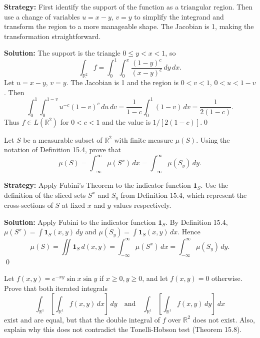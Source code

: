 \noindent\textbf{Strategy:} First identify the support of the function as a triangular region. Then use a change of variables \(u = x-y\), \(v = y\) to simplify the integrand and transform the region to a more manageable shape. The Jacobian is 1, making the transformation straightforward.

\bigskip\noindent\textbf{Solution:}
The support is the triangle \(0\le y < x < 1\), so
\[
\int_{\mathbb{R}^2} f = \int_0^1\!\int_0^x \frac{(1-y)^c}{(x-y)^c}\,dy\,dx.
\]
Let \(u=x-y\), \(v=y\). The Jacobian is 1 and the region is \(0<v<1\), \(0<u<1-v\). Then
\[
\int_0^1\!\int_0^{1-v} u^{-c}(1-v)^c\,du\,dv
= \frac{1}{1-c}\int_0^1 (1-v)\,dv = \frac{1}{2(1-c)}.
\]
Thus \(f\in L(\mathbb{R}^2)\) for \(0<c<1\) and the value is \(1/[2(1-c)]\).\qed


\begin{problembox}
Let \( S \) be a measurable subset of \( \mathbb{R}^2 \) with finite measure \( \mu(S) \). Using the notation of Definition 15.4, prove that
\[
\mu(S) = \int_{-\infty}^{\infty} \mu(S^x) \, dx = \int_{-\infty}^{\infty} \mu(S_y) \, dy.
\]
\end{problembox}

\noindent\textbf{Strategy:} Apply Fubini's Theorem to the indicator function \(\mathbf{1}_S\). Use the definition of the sliced sets \(S^x\) and \(S_y\) from Definition 15.4, which represent the cross-sections of \(S\) at fixed \(x\) and \(y\) values respectively.

\bigskip\noindent\textbf{Solution:}
Apply Fubini to the indicator function \(\mathbf{1}_S\). By Definition 15.4, \(\mu(S^x)=\int \mathbf{1}_S(x,y)\,dy\) and \(\mu(S_y)=\int \mathbf{1}_S(x,y)\,dx\). Hence
\[
\mu(S)=\iint \mathbf{1}_S\,d(x,y)=\int_{-\infty}^{\infty}\!\mu(S^x)\,dx=\int_{-\infty}^{\infty}\!\mu(S_y)\,dy.
\]\qed


\begin{problembox}
Let \( f(x, y) = e^{-xy} \sin x \sin y \) if \( x \geq 0, y \geq 0 \), and let \( f(x, y) = 0 \) otherwise. Prove that both iterated integrals
\[
\int_{\mathbb{R}^1} \left[ \int_{\mathbb{R}^1} f(x, y) \, dx \right] \, dy \quad \text{and} \quad \int_{\mathbb{R}^1} \left[ \int_{\mathbb{R}^1} f(x, y) \, dy \right] \, dx
\]
exist and are equal, but that the double integral of \( f \) over \( \mathbb{R}^2 \) does not exist. Also, explain why this does not contradict the Tonelli-Hobson test (Theorem 15.8).
\end{problembox}


